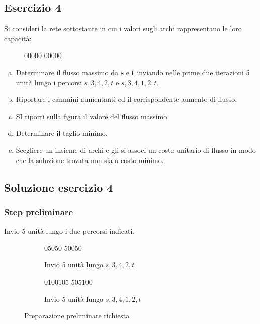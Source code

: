 \documentclass[\main/main.tex]{subfiles}
\begin{document}
\subsection{Esercizio 4}
Si consideri la rete sottostante in cui i valori sugli archi rappresentano le loro capacità:

\begin{figure}
  \currentGraphPreloader
  {0}{0}{0}{0}{0}
  {0}{0}{0}{0}{0}
  {\blackFlag}{\blackFlag}{\blackFlag}{\blackFlag}{\blackFlag}
  {\blackFlag}{\blackFlag}{\blackFlag}{\blackFlag}{\blackFlag}
\end{figure}

\begin{enumerate}[a)]
  \item Determinare il flusso massimo da \textbf{s} e \textbf{t} inviando nelle prime due iterazioni 5 unità lungo i percorsi $s,3,4,2,t$ e $s,3,4,1,2,t$.
  \item Riportare i cammini aumentanti ed il corrispondente aumento di flusso.
  \item SI riporti sulla figura il valore del flusso massimo.
  \item Determinare il taglio minimo.
  \item Scegliere un insieme di archi e gli si associ un costo unitario di flusso in modo che la soluzione trovata non sia a costo minimo.
\end{enumerate}

\subsection{Soluzione esercizio 4}
\subsubsection*{Step preliminare}
Invio 5 unità lungo i due percorsi indicati.

\begin{figure}
  \begin{subfigure}{0.49\textwidth}
    \currentGraphPreloader
    {0}{5}{0}{5}{0}
    {5}{0}{0}{5}{0}
    {\blackFlag}{\redFlag}{\blackFlag}{\redFlag}{\blackFlag}
    {\redFlag}{\blackFlag}{\blackFlag}{\redFlag}{\blackFlag}
    \caption{Invio 5 unità lungo $s,3,4,2,t$}
  \end{subfigure}
  \begin{subfigure}{0.49\textwidth}
    \currentGraphPreloader
    {0}{10}{0}{10}{5}
    {5}{0}{5}{10}{0}
    {\blackFlag}{\redFlag}{\blackFlag}{\redFlag}{\redFlag}
    {\blackFlag}{\blackFlag}{\redFlag}{\redFlag}{\blackFlag}
    \caption{Invio 5 unità lungo $s,3,4,1,2,t$}
  \end{subfigure}
  \caption{Preparazione preliminare richiesta}
\end{figure}
\end{document}
